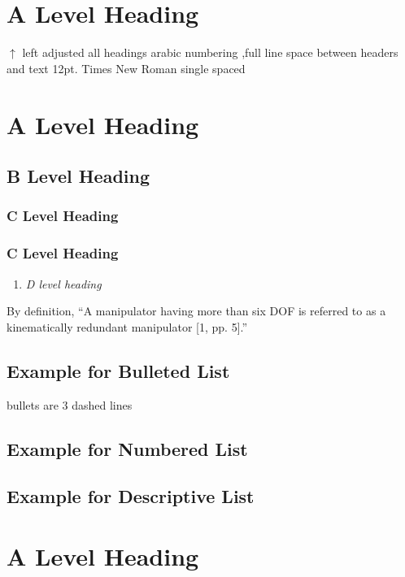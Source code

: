 \documentclass[12pt]{report}
\begin{document}
\normalsize
\flushleft
\singlespacing
\newpage
{}

\section{A Level Heading}

\color{red} $\uparrow$ left adjusted all headings arabic numbering ,full line space between headers and text \color{black}
\blindtext \cite{DBLP:journals/corr/JohnsonAL16} \color{red} 12pt. Times New Roman single spaced \color{black}
\section{A Level Heading}
\blindtext \cite{DBLP:journals/corr/RonnebergerFB15}
\subsection{B Level Heading}
\blindtext \cite{DBLP:journals/corr/abs-1803-09820}
\subsubsection{C Level Heading}
\blindtext
\subsubsection{C Level Heading}
\blindtext
\begin{enumerate}
\item \textit{D level heading}
\end{enumerate}
By definition, “A manipulator having more than six DOF is referred to as a kinematically redundant manipulator [1, pp. 5].”
\subsection{Example for Bulleted List}
\color{red} bullets are 3 dashed lines \color{black}
\blinditemize
\subsection{Example for Numbered List}
\blindenumerate
\subsection{Example for Descriptive List}
\blinddescription

\section{A Level Heading}
\blindtext
\end{document}
